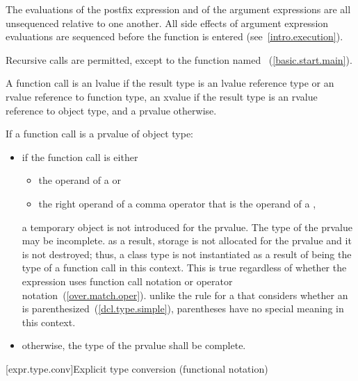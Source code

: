 \pnum
{}%
%
\enternote
The evaluations of the postfix expression and of the argument
expressions are all unsequenced relative to one another.
%
All side effects of
argument expression evaluations are sequenced before the function is
entered (see~\ref{intro.execution}).
\exitnote

\pnum
{}%
Recursive calls are permitted, except to the function named
~(\ref{basic.start.main}).

\pnum
A function call is an lvalue
if the result type is an lvalue reference type or an rvalue reference to function type,
an xvalue if the result type is an rvalue reference to object type, and a prvalue
otherwise.

\pnum
If a function call is a prvalue of object type:

\begin{itemize}
\item if the function call is either
\begin{itemize}
\item the operand of a  or
\item the right operand of a comma operator that is the operand of a
,
\end{itemize}
a temporary object is not introduced for the prvalue. The type of the prvalue
may be incomplete. \enternote as a result, storage is not allocated for the
prvalue and it is not destroyed; thus, a class type is not instantiated as a
result of being the type of a function call in this context. This is true
regardless of whether the expression uses function call notation or operator
notation~(\ref{over.match.oper}). \exitnote \enternote unlike the rule for
a  that considers whether an 
is parenthesized~(\ref{dcl.type.simple}), parentheses have no special meaning
in this context. \exitnote

\item otherwise, the type of the prvalue shall be complete.
\end{itemize}

[expr.type.conv]{Explicit type conversion (functional notation)}

